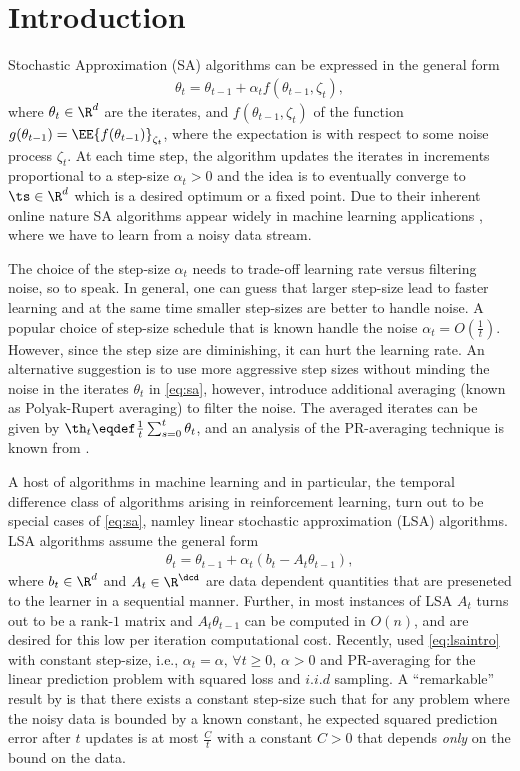 \section{Introduction}
Stochastic Approximation (SA) algorithms can be expressed in the general form
\begin{align}\label{eq:sa}
\theta_t=\theta_{t-1}+\alpha_t f(\theta_{t-1},\zeta_t),
\end{align}
where $\theta_t\in \R^d$ are the iterates, and $f(\theta_{t-1},\zeta_t)$ of the function $g(\theta_{t-1})=\EE{f(\theta_{t-1})}_{\zeta_t}$, where the expectation is with respect to some noise process $\zeta_t$. At each time step, the algorithm updates the iterates in increments proportional to a step-size $\alpha_t>0$ and the idea is to eventually converge to $\ts\in \R^d$ which is a desired optimum or a fixed point. Due to their inherent online nature SA algorithms appear widely in machine learning applications \cite{konda,bhatnagar,borkar,gtd,td,bach}, where we have to learn from a noisy data stream.\par
The choice of the step-size $\alpha_t$ needs to trade-off learning rate versus filtering noise, so to speak. In general, one can guess that larger step-size lead to faster learning and at the same time smaller step-sizes are better to handle noise. A popular choice of step-size schedule that is known handle the noise $\alpha_t=O(\frac{1}{t})$. However, since the step size are diminishing, it can hurt the learning rate. An alternative suggestion is to use more aggressive step sizes without minding the noise in the iterates $\theta_t$ in \eqref{eq:sa}, however, introduce additional averaging (known as Polyak-Rupert averaging) to filter the noise. The averaged iterates can be given by $\th_t\eqdef\frac{1}{t}\sum_{s=0}^t \theta_t$, and an analysis of the PR-averaging technique is known from \cite{}.\par
A host of algorithms in machine learning and in particular, the temporal difference class of algorithms arising in reinforcement learning, turn out to be special cases of \eqref{eq:sa}, namley linear stochastic approximation (LSA) algorithms. LSA algorithms assume the general form
\begin{align}\label{eq:lsaintro}
\theta_t=\theta_{t-1}+\alpha_t (b_t-A_t \theta_{t-1}),
\end{align}
where $b_t\in \R^d$ and $A_t\in \R^{\dcd}$ are data dependent quantities that are preseneted to the learner in a sequential manner. Further, in most instances of LSA $A_t$ turns out to be a rank-$1$ matrix and $A_t\theta_{t-1}$ can be computed in $O(n)$, and are desired for this low per iteration computational cost. Recently, \cite{bach} used \eqref{eq:lsaintro} with constant step-size, i.e., $\alpha_t=\alpha,\,\forall t\geq 0, \, \alpha >0$ and PR-averaging for the linear prediction problem with squared loss and $i.i.d$ sampling. A ``remarkable'' result by \cite{bach} is that there exists a constant step-size such that for any problem where the noisy data is bounded by a known constant, he expected squared prediction error after $t$ updates is at most $\frac{C}{t}$ with a constant $C>0$ that depends \emph{only} on the bound on the data.
